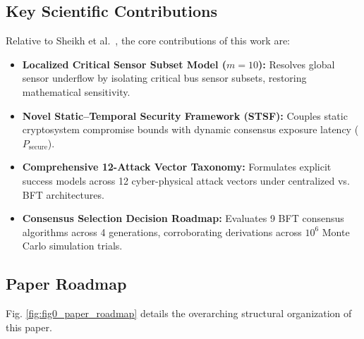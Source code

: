 \documentclass[10pt,twocolumn,journal]{IEEEtran}
\begin{document}
\subsection{Key Scientific Contributions}
Relative to Sheikh et al.~\cite{sheikh2020}, the core contributions of this work are:
\begin{itemize}[leftmargin=*]
    \item \textbf{Localized Critical Sensor Subset Model ($m=10$):} Resolves global sensor underflow by isolating critical bus sensor subsets, restoring mathematical sensitivity.
    \item \textbf{Novel Static–Temporal Security Framework (STSF):} Couples static cryptosystem compromise bounds with dynamic consensus exposure latency ($P_{\text{secure}}$).
    \item \textbf{Comprehensive 12-Attack Vector Taxonomy:} Formulates explicit success models across 12 cyber-physical attack vectors under centralized vs. BFT architectures.
    \item \textbf{Consensus Selection Decision Roadmap:} Evaluates 9 BFT consensus algorithms across 4 generations, corroborating derivations across $10^6$ Monte Carlo simulation trials.
\end{itemize}

\subsection{Paper Roadmap}
Fig. \ref{fig:fig0_paper_roadmap} details the overarching structural organization of this paper.
\end{document}
